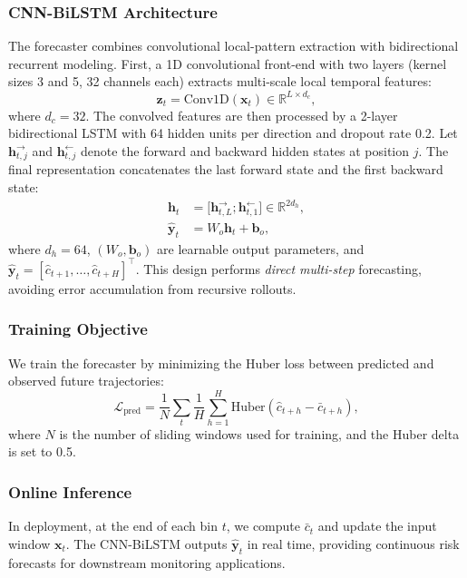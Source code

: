 \documentclass[journal]{IEEEtran}
\begin{document}
\subsubsection{CNN-BiLSTM Architecture}
The forecaster combines convolutional local-pattern extraction with bidirectional recurrent modeling. First, a 1D convolutional front-end with two layers (kernel sizes 3 and 5, 32 channels each) extracts multi-scale local temporal features:
\begin{equation}
\mathbf{z}_t = \mathrm{Conv1D}(\mathbf{x}_t) \in \mathbb{R}^{L \times d_c},
\end{equation}
where $d_c=32$. The convolved features are then processed by a 2-layer bidirectional LSTM with 64 hidden units per direction and dropout rate 0.2. Let $\mathbf{h}_{t,j}^{\rightarrow}$ and $\mathbf{h}_{t,j}^{\leftarrow}$ denote the forward and backward hidden states at position $j$. The final representation concatenates the last forward state and the first backward state:
\begin{align}
\mathbf{h}_t &= \big[\mathbf{h}_{t,L}^{\rightarrow}; \mathbf{h}_{t,1}^{\leftarrow}\big] \in \mathbb{R}^{2d_h}, \\
\hat{\mathbf{y}}_t &= W_o \mathbf{h}_t + \mathbf{b}_o,
\label{eq:cnn_lstm_head}
\end{align}
where $d_h=64$, $(W_o,\mathbf{b}_o)$ are learnable output parameters, and $\hat{\mathbf{y}}_t = [\hat{c}_{t+1},\dots,\hat{c}_{t+H}]^\top$. This design performs \emph{direct multi-step} forecasting, avoiding error accumulation from recursive rollouts.

\subsubsection{Training Objective}
We train the forecaster by minimizing the Huber loss between predicted and observed future trajectories:
\begin{equation}
\mathcal{L}_{\text{pred}} = \frac{1}{N}\sum_{t}\frac{1}{H}\sum_{h=1}^{H}
\mathrm{Huber}\!\left(\hat{c}_{t+h}-\bar{c}_{t+h}\right),
\label{eq:lstm_loss}
\end{equation}
where $N$ is the number of sliding windows used for training, and the Huber delta is set to 0.5.

\subsubsection{Online Inference}
In deployment, at the end of each bin $t$, we compute $\bar{c}_t$ and update the input window $\mathbf{x}_t$. The CNN-BiLSTM outputs $\hat{\mathbf{y}}_t$ in real time, providing continuous risk forecasts for downstream monitoring applications.
\end{document}
